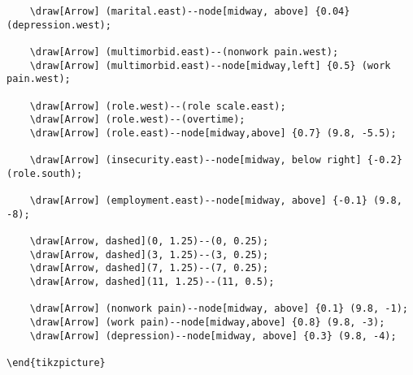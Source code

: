 \documentclass[a4paper]{report}
\begin{document}
\begin{framed}
\begin{Verbatim}
    \draw[Arrow] (marital.east)--node[midway, above] {0.04} (depression.west);
    
    \draw[Arrow] (multimorbid.east)--(nonwork pain.west);
    \draw[Arrow] (multimorbid.east)--node[midway,left] {0.5} (work pain.west);

    \draw[Arrow] (role.west)--(role scale.east);
    \draw[Arrow] (role.west)--(overtime);
    \draw[Arrow] (role.east)--node[midway,above] {0.7} (9.8, -5.5);
    
    \draw[Arrow] (insecurity.east)--node[midway, below right] {-0.2} (role.south);

    \draw[Arrow] (employment.east)--node[midway, above] {-0.1} (9.8, -8);

    \draw[Arrow, dashed](0, 1.25)--(0, 0.25);
    \draw[Arrow, dashed](3, 1.25)--(3, 0.25);
    \draw[Arrow, dashed](7, 1.25)--(7, 0.25);
    \draw[Arrow, dashed](11, 1.25)--(11, 0.5);
    
    \draw[Arrow] (nonwork pain)--node[midway, above] {0.1} (9.8, -1);
    \draw[Arrow] (work pain)--node[midway,above] {0.8} (9.8, -3);
    \draw[Arrow] (depression)--node[midway, above] {0.3} (9.8, -4);
    
\end{tikzpicture}


\end{Verbatim}
\end{framed}




\end{document}
